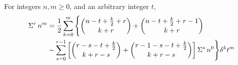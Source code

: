 \begin{proposition}
  \label{prop:multifold-sums-of-powers}
  For integers $n,m \geq 0$, and an arbitrary integer $t$,
  \begin{align*}
    \Sigma^{r}\,{n}^{m}
    &= \frac{1}{2} \sum_{k=0}^{m}
    \Bigg \{
      \binom{n-t+\frac{k}{2}+r}{k+r} + \binom{n-t+\frac{k}{2}+r-1}{k+r} \\
      &-
      \sum_{s=0}^{r-1}
      \left[
        \binom{r-s-t+\frac{k}{2}}{k+r-s} + \binom{r-1-s-t+\frac{k}{2}}{k+r-s}
      \right] \Sigma^{s}\,{n}^{0}
    \Bigg \} \delta^{k} t^m
  \end{align*}
\end{proposition}


